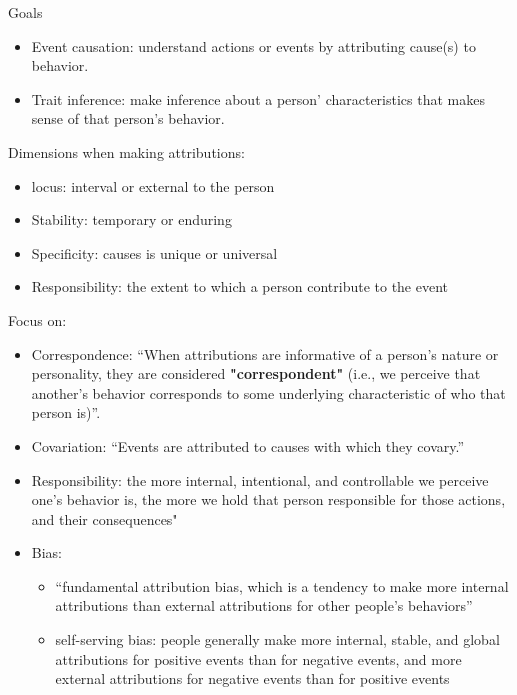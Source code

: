 \documentclass[
]{book}
\providecommand{\tightlist}{%
  \setlength{\itemsep}{0pt}\setlength{\parskip}{0pt}}
\begin{document}
Goals

\begin{itemize}
\tightlist
\item
  Event causation: understand actions or events by attributing cause(s) to behavior.
\item
  Trait inference: make inference about a person' characteristics that makes sense of that person's behavior.
\end{itemize}

Dimensions when making attributions:

\begin{itemize}
\tightlist
\item
  locus: interval or external to the person
\item
  Stability: temporary or enduring
\item
  Specificity: causes is unique or universal
\item
  Responsibility: the extent to which a person contribute to the event
\end{itemize}

Focus on:

\begin{itemize}
\item
  Correspondence: ``When attributions are informative of a person's nature or personality, they are considered
  \textbf{"correspondent"} (i.e., we perceive that another's behavior corresponds to some underlying characteristic of who
  that person is)''.
\item
  Covariation: ``Events are attributed to causes with which they covary.''
\item
  Responsibility: the more internal, intentional, and controllable we perceive one's behavior is, the more we hold
  that person responsible for those actions, and their consequences"\\
\item
  Bias:

  \begin{itemize}
  \tightlist
  \item
    ``fundamental attribution bias, which is a tendency to make more internal attributions than external attributions
    for other people's behaviors'' \citep{Ross_1977}
  \item
    self-serving bias: people generally make more internal, stable, and global attributions for positive events than
    for negative events, and more external attributions for negative events than for positive events \citep{Malle_2006}
  \end{itemize}
\end{itemize}
\end{document}
